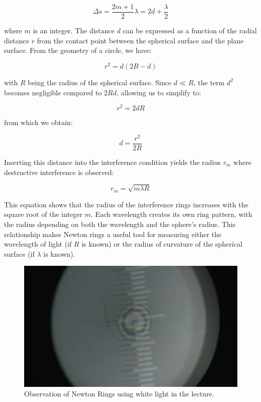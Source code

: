 \documentclass[
  a4paper,
]{book}
\begin{document}
\[
\Delta s=\frac{2m+1}{2}\lambda=2d+\frac{\lambda}{2}
\]

where \(m\) is an integer. The distance \(d\) can be expressed as a
function of the radial distance \(r\) from the contact point between the
spherical surface and the plane surface. From the geometry of a circle,
we have:

\[
r^2=d(2R-d)
\]

with \(R\) being the radius of the spherical surface. Since \(d\ll R\),
the term \(d^2\) becomes negligible compared to \(2Rd\), allowing us to
simplify to:

\[
r^2=2dR
\]

from which we obtain:

\[
d=\frac{r^2}{2R}
\]

Inserting this distance into the interference condition yields the
radius \(r_m\) where destructive interference is observed:

\[
r_m=\sqrt{m\lambda R}
\]

This equation shows that the radius of the interference rings increases
with the square root of the integer \(m\). Each wavelength creates its
own ring pattern, with the radius depending on both the wavelength and
the sphere's radius. This relationship makes Newton rings a useful tool
for measuring either the wavelength of light (if \(R\) is known) or the
radius of curvature of the spherical surface (if \(\lambda\) is known).

\begin{figure}[H]

{\centering \includegraphics[width=0.8\linewidth,height=\textheight,keepaspectratio]{wave-optics/img/newton_rings_lecture.png}

}

\caption{Observation of Newton Rings using white light in the lecture.}

\end{figure}%
\end{document}
